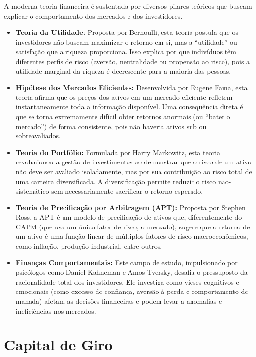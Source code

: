 \documentclass[
  a4paper,
]{book}
\providecommand{\tightlist}{%
  \setlength{\itemsep}{0pt}\setlength{\parskip}{0pt}}\usepackage{longtable,booktabs,array}
\begin{document}
A moderna teoria financeira é sustentada por diversos pilares teóricos
que buscam explicar o comportamento dos mercados e dos investidores.

\begin{itemize}
\tightlist
\item
  \textbf{Teoria da Utilidade:} Proposta por Bernoulli, esta teoria
  postula que os investidores não buscam maximizar o retorno em si, mas
  a ``utilidade'' ou satisfação que a riqueza proporciona. Isso explica
  por que indivíduos têm diferentes perfis de risco (aversão,
  neutralidade ou propensão ao risco), pois a utilidade marginal da
  riqueza é decrescente para a maioria das pessoas.
\item
  \textbf{Hipótese dos Mercados Eficientes:} Desenvolvida por Eugene
  Fama, esta teoria afirma que os preços dos ativos em um mercado
  eficiente refletem instantaneamente toda a informação disponível. Uma
  consequência direta é que se torna extremamente difícil obter retornos
  anormais (ou ``bater o mercado'') de forma consistente, pois não
  haveria ativos sub ou sobreavaliados.
\item
  \textbf{Teoria do Portfólio:} Formulada por Harry Markowitz, esta
  teoria revolucionou a gestão de investimentos ao demonstrar que o
  risco de um ativo não deve ser avaliado isoladamente, mas por sua
  contribuição ao risco total de uma carteira diversificada. A
  diversificação permite reduzir o risco não-sistemático sem
  necessariamente sacrificar o retorno esperado.
\item
  \textbf{Teoria de Precificação por Arbitragem (APT):} Proposta por
  Stephen Ross, a APT é um modelo de precificação de ativos que,
  diferentemente do CAPM (que usa um único fator de risco, o mercado),
  sugere que o retorno de um ativo é uma função linear de múltiplos
  fatores de risco macroeconômicos, como inflação, produção industrial,
  entre outros.
\item
  \textbf{Finanças Comportamentais:} Este campo de estudo, impulsionado
  por psicólogos como Daniel Kahneman e Amos Tversky, desafia o
  pressuposto da racionalidade total dos investidores. Ele investiga
  como vieses cognitivos e emocionais (como excesso de confiança,
  aversão à perda e comportamento de manada) afetam as decisões
  financeiras e podem levar a anomalias e ineficiências nos mercados.
\end{itemize}


\chapter{Capital de Giro}\label{sec-giro}
\end{document}
